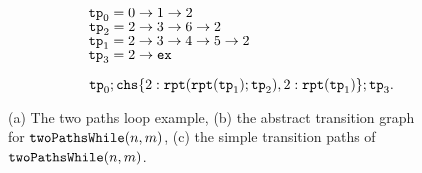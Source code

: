 {\begin{figure}
\begin{subfigure}{.71\textwidth}
\begin{subfigure}{.67\textwidth}
\begin{centering}
\begin{tikzpicture}[scale=\textwidth/20cm,samples=200]
  \end{tikzpicture}
        \caption{}
\end{centering}
\end{subfigure}
{\small
\begin{subfigure}{.3\textwidth}
\begin{centering}
        $\tpath_0 = 0 \to 1 \to 2$ \\
        $\tpath_2 = 2 \to 3 \to 6 \to 2$ \\ 
        $\tpath_1 = 2 \to 3 \to 4 \to 5 \to 2$ \\
        $\tpath_3 = 2 \to \lex$
        \caption{}
\end{centering}
\end{subfigure}
}
{\small
\begin{subfigure}{.8\textwidth}
\begin{centering}
    $
    \tpath_0 ; 
    \rpchoose{2: \rprepeat(\rprepeat(\tpath_1); \tpath_2), 
    2: \rprepeat(\tpath_1)}; \tpath_3.
    $
\end{centering}
\end{subfigure}
}
\end{subfigure}
\vspace{-0.2cm}
\caption{
    (a) The two paths loop example,
    (b) the abstract transition graph for $\kw{twoPathsWhile}(n, m)$,
    (c) the simple transition paths of $\kw{twoPathsWhile}(n, m)$.}
    \vspace{-0.5cm}
        \label{fig:whileTwoCounters-overview}
    \end{figure}
    }


